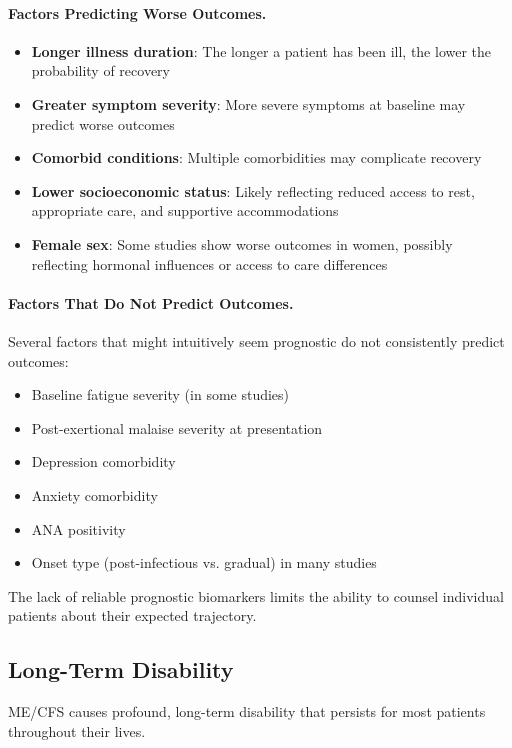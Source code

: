 \paragraph{Factors Predicting Worse Outcomes.}
\begin{itemize}
    \item \textbf{Longer illness duration}: The longer a patient has been ill, the lower the probability of recovery
    \item \textbf{Greater symptom severity}: More severe symptoms at baseline may predict worse outcomes
    \item \textbf{Comorbid conditions}: Multiple comorbidities may complicate recovery
    \item \textbf{Lower socioeconomic status}: Likely reflecting reduced access to rest, appropriate care, and supportive accommodations
    \item \textbf{Female sex}: Some studies show worse outcomes in women, possibly reflecting hormonal influences or access to care differences
\end{itemize}

\paragraph{Factors That Do Not Predict Outcomes.}
Several factors that might intuitively seem prognostic do not consistently predict outcomes:
\begin{itemize}
    \item Baseline fatigue severity (in some studies)
    \item Post-exertional malaise severity at presentation
    \item Depression comorbidity
    \item Anxiety comorbidity
    \item ANA positivity
    \item Onset type (post-infectious vs. gradual) in many studies
\end{itemize}

The lack of reliable prognostic biomarkers limits the ability to counsel individual patients about their expected trajectory.

\subsection{Long-Term Disability}

ME/CFS causes profound, long-term disability that persists for most patients throughout their lives.


